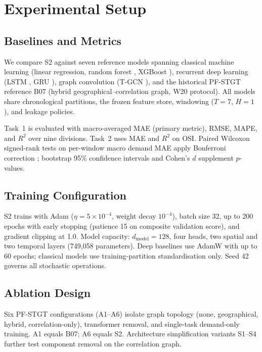 \section{Experimental Setup}\label{sec:experimental_setup}

\subsection{Baselines and Metrics}

We compare S2 against seven reference models spanning classical machine learning (linear regression, random forest \cite{Breiman2001RandomForest}, XGBoost \cite{Chen2016XGBoost}), recurrent deep learning (LSTM \cite{Hochreiter1997LSTM}, GRU \cite{Cho2014GRU}), graph convolution (T-GCN \cite{Zhao2020TGCN}), and the historical PF-STGT reference B07 (hybrid geographical--correlation graph, W20 protocol). All models share chronological partitions, the frozen feature store, windowing ($T{=}7$, $H{=}1$), and leakage policies.

Task~1 is evaluated with macro-averaged MAE (primary metric), RMSE, MAPE, and $R^2$ over nine divisions. Task~2 uses MAE and $R^2$ on OSI. Paired Wilcoxon signed-rank tests \cite{Wilcoxon1945SignedRank} on per-window macro demand MAE apply Bonferroni correction \cite{Dunn1961Bonferroni}; bootstrap 95\% confidence intervals \cite{Efron1993Bootstrap} and Cohen's $d$ \cite{Cohen1988StatisticalPower} supplement $p$-values.

\subsection{Training Configuration}

S2 trains with Adam \cite{Kingma2015Adam} ($\eta{=}5{\times}10^{-4}$, weight decay $10^{-4}$), batch size 32, up to 200 epochs with early stopping (patience 15 on composite validation score), and gradient clipping at 1.0. Model capacity: $d_{\mathrm{model}}{=}128$, four heads, two spatial and two temporal layers (749,058 parameters). Deep baselines use AdamW with up to 60 epochs; classical models use training-partition standardisation only. Seed 42 governs all stochastic operations.

\subsection{Ablation Design}

Six PF-STGT configurations (A1--A6) isolate graph topology (none, geographical, hybrid, correlation-only), transformer removal, and single-task demand-only training. A1 equals B07; A6 equals S2. Architecture simplification variants S1--S4 further test component removal on the correlation graph.
